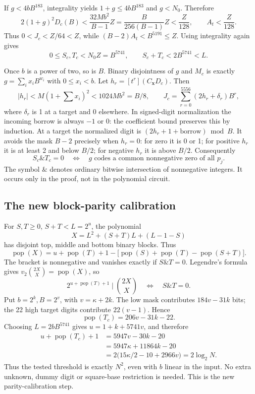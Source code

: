 If \(g<4bB^{183}\), integrality yields \(1+g\leq4bB^{183}\) and
\(g<N_0\). Therefore
\[
2(1+g)^2D_c(B)<\frac{32Mb^2}{B-1}Z
 =\frac{B}{256(B-1)}Z<\frac Z{128},\qquad
 A_t<\frac Z{128}.
\]
Thus \(0<J_c<Z/64<Z\), while \((B-2)A_t<B^{5191}\leq Z\).
Using integrality again gives
\[
 0\leq S_c,T_c<N_0Z=B^{5741},\qquad S_c+T_c<2B^{5741}<L.
\]

Once \(b\) is a power of two, so is \(B\). Binary disjointness of
\(g\) and \(M_c\) is exactly
\(g=\sum_i x_iB^{w_i}\) with \(0\leq x_i<b\).
Let \(h_r=[t^r](C_{\mathbf x}D_c)\). Then
\[
 |h_r|<M(1+\sum x_i)^2<1024Mb^2=B/8,
 \qquad J_c=\sum_{r=0}^{5556}(2h_r+\delta_r)B^r,
\]
where \(\delta_r\) is 1 at a target and 0 elsewhere. In signed-digit
normalization the incoming borrow is always \(-1\) or 0: the coefficient
bound preserves this by induction. At a target the normalized digit is
\((2h_r+1+\text{borrow})\bmod B\). It avoids the mask \(B-2\) precisely
when \(h_r=0\): for zero it is 0 or 1; for positive \(h_r\) it is at
least 2 and below \(B/2\); for negative \(h_r\) it is above \(B/2\).
Consequently
\[
 S_c\mathbin{\&}T_c=0
 \quad\Longleftrightarrow\quad
 g\text{ codes a common nonnegative zero of all }p_j.
\]
The symbol \(\&\) denotes ordinary bitwise intersection of nonnegative
integers. It occurs only in the proof, not in the polynomial circuit.

\subsection{The new block-parity calibration}
For \(S,T\geq0\), \(S+T<L=2^u\), the polynomial
\[
 X=L^2+(S+T)L+(L-1-S)
\]
has disjoint top, middle and bottom binary blocks. Thus
\[
\operatorname{pop}(X)=u+\operatorname{pop}(T)+1
 -\bigl[\operatorname{pop}(S)+\operatorname{pop}(T)-\operatorname{pop}(S+T)\bigr].
\]
The bracket is nonnegative and vanishes exactly if \(S\mathbin{\&}T=0\).
Legendre's formula gives
\(v_2\binom{2X}{X}=\operatorname{pop}(X)\), so
\[
 2^{u+\operatorname{pop}(T)+1}\mid\binom{2X}{X}
       \quad\Longleftrightarrow\quad S\mathbin{\&}T=0.
\]
Put \(b=2^k,B=2^v\), with \(v=\kappa+2k\).
The low mask contributes \(184v-31k\) bits; the 22 high target digits
contribute \(22(v-1)\). Hence
\[
 \operatorname{pop}(T_c)=206v-31k-22.
\]
Choosing \(L=2bB^{5741}\) gives \(u=1+k+5741v\), and therefore
\begin{align*}
 u+\operatorname{pop}(T_c)+1
 &=5947v-30k-20\\
 &=5947\kappa+11864k-20\\
 &=2\bigl(15\kappa/2-10+2966v\bigr)=2\log_2N.
\end{align*}
Thus the tested threshold is exactly \(N^2\), even with \(b\) linear
in the input. No extra unknown, dummy digit or square-base restriction is
needed. This is the new parity-calibration step.

